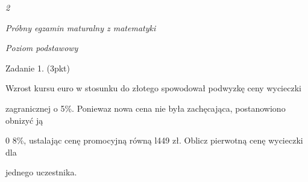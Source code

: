 \documentclass[a4paper,12pt]{article}
\begin{document}
{\it 2}

{\it Próbny egzamin maturalny z matematyki}

{\it Poziom podstawowy}

Zadanie 1. (3pkt)

Wzrost kursu euro w stosunku do złotego spowodował podwyzkę ceny wycieczki

zagranicznej o 5\%. Poniewaz nowa cena nie była zachęcająca, postanowiono obnizyć ją

0 8\%, ustalając cenę promocyjną równą l449 zł. Oblicz pierwotną cenę wycieczki dla

jednego uczestnika.
\end{document}
